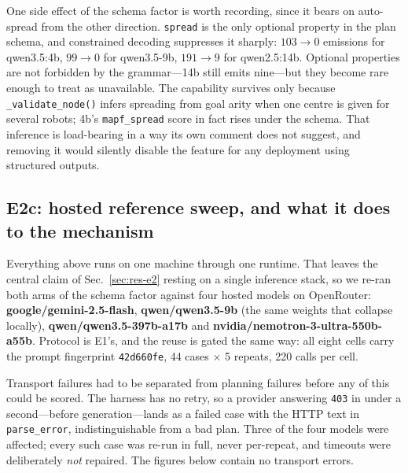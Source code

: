 \documentclass[10pt,twocolumn]{article}
\newcommand{\code}[1]{\texttt{\small #1}}
\begin{document}
One side effect of the schema factor is worth recording, since it bears on
auto-spread from the other direction. \code{spread} is the only optional
property in the plan schema, and constrained decoding suppresses it sharply:
$103\to0$ emissions for qwen3.5:4b, $99\to0$ for qwen3.5-9b, $191\to9$ for
qwen2.5:14b. Optional properties are not forbidden by the grammar---14b still
emits nine---but they become rare enough to treat as unavailable. The
capability survives only because \code{\_validate\_node()} infers spreading
from goal arity when one centre is given for several robots; 4b's
\code{mapf\_spread} score in fact rises under the schema. That inference is
load-bearing in a way its own comment does not suggest, and removing it would
silently disable the feature for any deployment using structured outputs.

\subsection{E2c: hosted reference sweep, and what it does to the mechanism}
\label{sec:res-e2c}

Everything above runs on one machine through one runtime. That leaves the
central claim of Sec.~\ref{sec:res-e2} resting on a single inference stack, so
we re-ran both arms of the schema factor against four hosted models on
OpenRouter: \textbf{google/gemini-2.5-flash}, \textbf{qwen/qwen3.5-9b} (the
same weights that collapse locally), \textbf{qwen/qwen3.5-397b-a17b} and
\textbf{nvidia/nemotron-3-ultra-550b-a55b}. Protocol is E1's, and the reuse is
gated the same way: all eight cells carry the prompt fingerprint
\code{42d660fe}, 44 cases $\times$ 5 repeats, 220 calls per cell.

Transport failures had to be separated from planning failures before any of
this could be scored. The harness has no retry, so a provider answering
\code{403} in under a second---before generation---lands as a failed case with
the HTTP text in \code{parse\_error}, indistinguishable from a bad plan. Three
of the four models were affected; every such case was re-run in full, never
per-repeat, and timeouts were deliberately \emph{not} repaired. The figures
below contain no transport errors.
\end{document}
